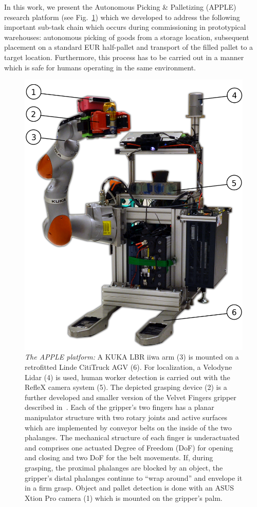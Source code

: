 In this work, we present the Autonomous Picking \& Palletizing (APPLE) research platform (see
Fig.~\ref{fig:robot}) which we developed to address the following important sub-task chain which
occurs during commissioning in prototypical warehouses: autonomous picking of goods from a storage
location, subsequent placement on a standard EUR half-pallet and transport of the filled pallet to a
target location. Furthermore, this process has to be carried out in a manner which is safe for
humans operating in the same environment.
%
\begin{figure}[t!]
\begin{center}
\includegraphics[width =0.85\linewidth]{figs/apple_demonstrator}
\caption{\textit{The APPLE platform:} A KUKA LBR iiwa arm (3) is mounted on a retrofitted Linde
  CitiTruck AGV (6). For localization, a Velodyne Lidar (4) is used, human worker detection is
  carried out with the RefleX camera system (5). The depicted grasping device (2) is a further
  developed and smaller version of the Velvet Fingers gripper described in~\cite{Tinc12}. Each of
  the gripper’s two fingers has a planar manipulator structure with two rotary joints and active
  surfaces which are implemented by conveyor belts on the inside of the two phalanges. The
  mechanical structure of each finger is underactuated and comprises one actuated Degree of Freedom
  (DoF) for opening and closing and two DoF for the belt movements. If, during grasping, the
  proximal phalanges are blocked by an object, the gripper’s distal phalanges continue to “wrap
  around” and envelope it in a firm grasp. Object and pallet detection is done with an ASUS Xtion
  Pro camera (1) which is mounted on the gripper's palm.}
\label{fig:robot}
\vspace{-0.65cm}
\end{center}
\end{figure}
